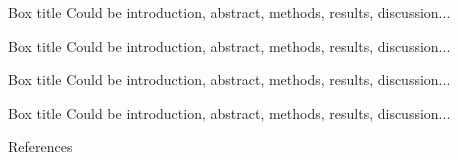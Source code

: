 \documentclass[
    a0paper, %
    landscape, %
    fontscale=0.4 %
    ]{baposter}
\begin{document}
\begin{poster}
\begin{posterbox}[
    name = box5,  %
    column = 4, %
    ]{Box title}
    Could be introduction, abstract, methods, results, discussion...
\end{posterbox}


\begin{posterbox}[
    name = box6,  %
    column = 4, %
    below = box5 %
    ]{Box title}
    Could be introduction, abstract, methods, results, discussion...
\end{posterbox}


\begin{posterbox}[
    name = box7,  %
    column = 4, %
    below = box6 %
    ]{Box title}
    Could be introduction, abstract, methods, results, discussion...
\end{posterbox}


\begin{posterbox}[
    name = box8,  %
    column = 4, %
    below = box7 %
    ]{Box title}
    Could be introduction, abstract, methods, results, discussion...
\end{posterbox}

\begin{posterbox}[
    name = references,  %
    column = 4, %
    below = box8, %
    bottomaligned = message, %
    ]{References}
\renewcommand{\section}[2]{} %
\nocite{*} %

\end{posterbox}

\end{poster}
\end{document}
